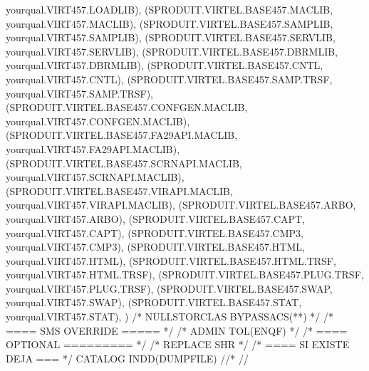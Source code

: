 \documentclass[letterpaper,10pt,english]{sphinxmanual}
\begin{document}
\begin{sphinxVerbatim}[commandchars=\\\{\}]
            yourqual.VIRT457.LOADLIB), \PYGZhy{}
    (SPRODUIT.VIRTEL.BASE457.MACLIB, \PYGZhy{}
            yourqual.VIRT457.MACLIB), \PYGZhy{}
    (SPRODUIT.VIRTEL.BASE457.SAMPLIB, \PYGZhy{}
            yourqual.VIRT457.SAMPLIB), \PYGZhy{}
    (SPRODUIT.VIRTEL.BASE457.SERVLIB, \PYGZhy{}
            yourqual.VIRT457.SERVLIB), \PYGZhy{}
    (SPRODUIT.VIRTEL.BASE457.DBRMLIB, \PYGZhy{}
            yourqual.VIRT457.DBRMLIB), \PYGZhy{}
    (SPRODUIT.VIRTEL.BASE457.CNTL, \PYGZhy{}
            yourqual.VIRT457.CNTL), \PYGZhy{}
    (SPRODUIT.VIRTEL.BASE457.SAMP.TRSF, \PYGZhy{}
            yourqual.VIRT457.SAMP.TRSF), \PYGZhy{}
    (SPRODUIT.VIRTEL.BASE457.CONFGEN.MACLIB, \PYGZhy{}
            yourqual.VIRT457.CONFGEN.MACLIB), \PYGZhy{}
    (SPRODUIT.VIRTEL.BASE457.FA29API.MACLIB, \PYGZhy{}
            yourqual.VIRT457.FA29API.MACLIB), \PYGZhy{}
    (SPRODUIT.VIRTEL.BASE457.SCRNAPI.MACLIB, \PYGZhy{}
            yourqual.VIRT457.SCRNAPI.MACLIB), \PYGZhy{}
    (SPRODUIT.VIRTEL.BASE457.VIRAPI.MACLIB, \PYGZhy{}
            yourqual.VIRT457.VIRAPI.MACLIB), \PYGZhy{}
    (SPRODUIT.VIRTEL.BASE457.ARBO, \PYGZhy{}
            yourqual.VIRT457.ARBO), \PYGZhy{}
    (SPRODUIT.VIRTEL.BASE457.CAPT, \PYGZhy{}
            yourqual.VIRT457.CAPT), \PYGZhy{}
    (SPRODUIT.VIRTEL.BASE457.CMP3, \PYGZhy{}
            yourqual.VIRT457.CMP3), \PYGZhy{}
    (SPRODUIT.VIRTEL.BASE457.HTML, \PYGZhy{}
            yourqual.VIRT457.HTML), \PYGZhy{}
    (SPRODUIT.VIRTEL.BASE457.HTML.TRSF, \PYGZhy{}
            yourqual.VIRT457.HTML.TRSF), \PYGZhy{}
    (SPRODUIT.VIRTEL.BASE457.PLUG.TRSF, \PYGZhy{}
            yourqual.VIRT457.PLUG.TRSF), \PYGZhy{}
            (SPRODUIT.VIRTEL.BASE457.SWAP, \PYGZhy{}
                    yourqual.VIRT457.SWAP), \PYGZhy{}
            (SPRODUIT.VIRTEL.BASE457.STAT, \PYGZhy{}
                    yourqual.VIRT457.STAT), \PYGZhy{}
                    ) \textendash{}
    /* NULLSTORCLAS BYPASSACS(**) */ /* \PYGZlt{}==== SMS OVERRIDE ===== */ \PYGZhy{}
    /* ADMIN TOL(ENQF) */                    /* \PYGZlt{}==== OPTIONAL ========= */ \PYGZhy{}
    /* REPLACE SHR */                                /* \PYGZlt{}==== SI EXISTE DEJA === */ \PYGZhy{}
            CATALOG INDD(DUMPFILE)
    //*
    //
\end{sphinxVerbatim}

\end{document}

